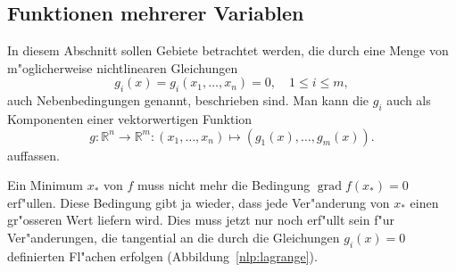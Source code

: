 \subsection{Funktionen mehrerer Variablen\label{nlp:nebenbedingungen:mehrereariable}}
In diesem Abschnitt
sollen Gebiete betrachtet werden, die durch
eine Menge von m"oglicherweise nichtlinearen Gleichungen
\begin{equation}
g_i(x) = g_i(x_1,\dots,x_n) = 0, \quad 1\le i\le m,
\end{equation}
auch Nebenbedingungen genannt,
beschrieben sind. Man kann die $g_i$ auch als Komponenten einer
vektorwertigen Funktion
\begin{equation}
g\colon \mathbb R^n\to \mathbb R^m:(x_1,\dots,x_n)\mapsto (g_1(x),\dots, g_m(x)).
\end{equation}
auffassen.

Ein Minimum $x_*$ von $f$ muss nicht mehr die Bedingung
$\operatorname{grad}f(x_*)=0$ erf"ullen. Diese Bedingung gibt ja
wieder, dass jede Ver"anderung von $x_*$ einen gr"osseren Wert
liefern wird. Dies muss jetzt nur noch erf"ullt sein f"ur
Ver"anderungen, die tangential an die durch die Gleichungen
$g_i(x)=0$ definierten Fl"achen erfolgen (Abbildung~\ref{nlp:lagrange}). 

